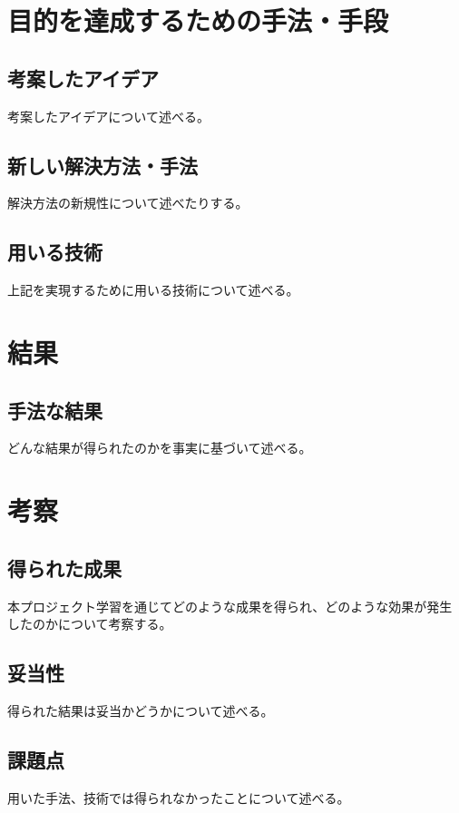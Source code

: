 \chapter{目的を達成するための手法・手段}
\section{考案したアイデア}
考案したアイデアについて述べる。

\section{新しい解決方法・手法}
解決方法の新規性について述べたりする。

\section{用いる技術}
上記を実現するために用いる技術について述べる。

\chapter{結果}
\section{手法な結果}
どんな結果が得られたのかを事実に基づいて述べる。

\chapter{考察}
\section{得られた成果}
本プロジェクト学習を通じてどのような成果を得られ、どのような効果が発生したのかについて考察する。

\section{妥当性}
得られた結果は妥当かどうかについて述べる。

\section{課題点}
用いた手法、技術では得られなかったことについて述べる。

